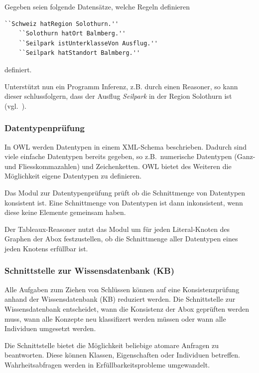 Gegeben seien folgende Datensätze, welche Regeln definieren

\begin{lstlisting}[caption={Aussagentripel bestehend aus Objekt, Prädikat und Subjekt},captionpos=b,label=lst:reasoning_seilpark]
    ``Schweiz hatRegion Solothurn.''
    ``Solothurn hatOrt Balmberg.''
    ``Seilpark istUnterklasseVon Ausflug.''
    ``Seilpark hatStandort Balmberg.''
\end{lstlisting}

definiert.

Unterstützt nun ein Programm Inferenz, z.B. durch einen Reasoner, so kann dieser schlussfolgern, dass der Ausflug \textit{Seilpark} in der Region Solothurn ist (vgl.~\cite[Abschnitt `Examples']{w3inference}).


\subsubsection{Datentypenprüfung}
\label{ssubsection:inferenz_pellet_datatypes}
In OWL werden Datentypen in einem XML-Schema beschrieben. Dadurch sind viele einfache Datentypen bereits gegeben, so z.B.\ numerische Datentypen (Ganz- und Fliesskommazahlen) und Zeichenketten. OWL bietet des Weiteren die Möglichkeit eigene Datentypen zu definieren.

Das Modul zur Datentypenprüfung prüft ob die Schnittmenge von Datentypen konsistent ist. Eine Schnittmenge von Datentypen ist dann inkonsistent, wenn diese keine Elemente gemeinsam haben.

Der Tableaux-Reasoner nutzt das Modul um für jeden Literal-Knoten des Graphen der Abox festzustellen, ob die Schnittmenge aller Datentypen eines jeden Knotens erfüllbar ist.

\subsubsection{Schnittstelle zur Wissensdatenbank (KB)}
\label{ssubsection:inferenz_pellet_kb}
Alle Aufgaben zum Ziehen von Schlüssen können auf eine Konsistenzprüfung anhand der Wissensdatenbank (KB) reduziert werden. Die Schnittstelle zur Wissensdatenbank entscheidet, wann die Konsistenz der Abox geprüften werden muss, wann alle Konzepte neu klassifizert werden müssen oder wann alle Individuen umgesetzt werden. %

Die Schnittstelle bietet die Möglichkeit beliebige atomare Anfragen zu beantworten. Diese können Klassen, Eigenschaften oder Individuen betreffen. Wahrheitsabfragen werden in Erfüllbarkeitsprobleme umgewandelt.

